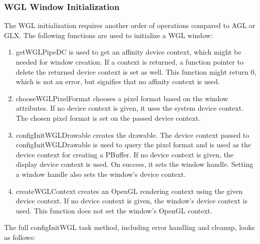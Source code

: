 \documentclass[10pt,a4]{scrartcl}
\begin{document}
\subsubsection{WGL Window Initialization}

The WGL initialization requires another order of operations compared to
AGL or GLX. The following functions are used to initialize a WGL window:

\begin{enumerate}
\item\textsf{getWGLPipeDC} is used to get an affinity device context,
  which might be needed for window creation. If a context is returned, a
  function pointer to delete the returned device context is set as
  well. This function might return 0, which is not an error, but
  signifies that no affinity context is used.
\item\textsf{chooseWGLPixelFormat} chooses a pixel format based on the
  window attributes. If no device context is given, it uses the system
  device context. The chosen pixel format is set on the passed device
  context.
\item\textsf{configInitWGLDrawable} creates the drawable. The device
  context passed to \textsf{configInitWGLDrawable} is used to query the
  pixel format and is used as the device context for creating a
  PBuffer. If no device context is given, the display device context is
  used. On success, it sets the window handle. Setting a window handle
  also sets the window's device context.
\item\textsf{createWGLContext} creates an OpenGL rendering context using
  the given device context. If no device context is given, the window's
  device context is used. This function does not set the window's OpenGL
  context.
\end{enumerate}

The full \textsf{configInitWGL} task method, including error handling
and cleanup, looks as follows:
\end{document}

